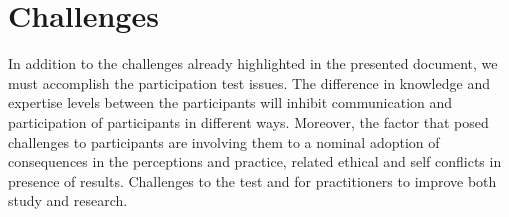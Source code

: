 
\section{Challenges}
\label{sec:sec010}

In addition to the challenges already highlighted in the presented document, we must accomplish the participation test issues. The difference in knowledge and expertise levels between the participants will inhibit communication and participation of participants in different ways. Moreover, the factor that posed challenges to participants are involving them to a nominal adoption of consequences in the perceptions and practice, related ethical and self conflicts in presence of results. Challenges to the test and for practitioners to improve both study and research.